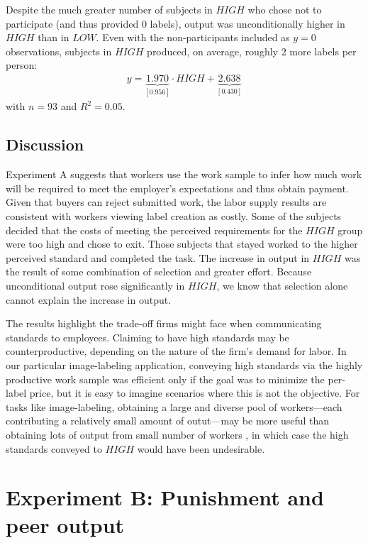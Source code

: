 \documentclass[12pt]{article}
\begin{document}
Despite the much greater number of subjects in $HIGH$ who chose not to
participate (and thus provided $0$ labels), output was unconditionally
higher in $HIGH$ than in $LOW$. Even with the non-participants
included as $y=0$ observations, subjects in $HIGH$ produced, on
average, roughly $2$ more labels per person:
\begin{align}y = \underbrace{1.970}_{[0.956]}\cdot HIGH +  
\underbrace{2.638}_{[0.430]} \end{align}
with $n = 93$ and $R^2 = 0.05$.

\subsection{Discussion} 
Experiment A suggests that workers use the work sample to infer how
much work will be required to meet the employer's expectations and
thus obtain payment. Given that buyers can reject submitted work, the
labor supply results are consistent with workers viewing label
creation as costly. Some of the subjects decided that the costs of
meeting the perceived requirements for the $HIGH$ group were too high
and chose to exit. Those subjects that stayed worked to the higher
perceived standard and completed the task. The increase in output in
$HIGH$ was the result of some combination of selection and greater
effort. Because unconditional output rose significantly in $HIGH$, we
know that selection alone cannot explain the increase in output.

The results highlight the trade-off firms might face when
communicating standards to employees. Claiming to have high standards
may be counterproductive, depending on the nature of the firm's demand
for labor. In our particular image-labeling application, conveying
high standards via the highly productive work sample was efficient
only if the goal was to minimize the per-label price, but it is easy
to imagine scenarios where this is not the objective. For tasks like
image-labeling, obtaining a large and diverse pool of workers---each
contributing a relatively small amount of outut---may be more useful
than obtaining lots of output from small number of workers , in which
case the high standards conveyed to $HIGH$ would have been
undesirable.

\section{Experiment B: Punishment and peer output}
\end{document}
